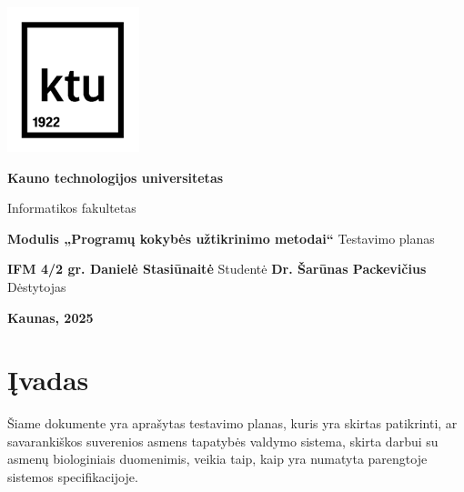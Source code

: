 \documentclass[12pt]{article}
\begin{document}

\begin{titlepage}
\vskip 20pt
\begin{center}
\includegraphics[scale=1.4]{KTU.png}
\end{center}


\vskip 20pt
\centerline{\bf \large \textbf{Kauno technologijos universitetas}}
\bigskip
\centerline{\large {Informatikos fakultetas}}
\bigskip

\vskip 90pt
\begin{center}
    {\bf \LARGE Modulis „Programų kokybės užtikrinimo metodai“}
    \vskip 15pt
    {\large Testavimo planas}
\end{center}

\vskip 40pt

\hskip 200pt {\bf \large IFM 4/2 gr. Danielė Stasiūnaitė}
\vskip 1pt
\hskip 200pt {\large Studentė}
\vskip 7pt
\hskip 200pt {\bf \large Dr. Šarūnas Packevičius}
\vskip 1pt
\hskip 200pt {\large Dėstytojas}

\bigskip

\vskip 100pt
\centerline{\large \textbf{Kaunas, 2025}}
\newpage
\end{titlepage}



\tableofcontents
\newpage


\section{Įvadas}
Šiame dokumente yra aprašytas testavimo planas, kuris yra skirtas patikrinti, ar
savarankiškos suverenios asmens tapatybės valdymo sistema, skirta darbui su
asmenų biologiniais duomenimis, veikia taip, kaip yra numatyta parengtoje
sistemos specifikacijoje.
\end{document}
